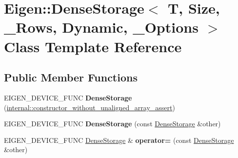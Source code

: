 \hypertarget{class_eigen_1_1_dense_storage_3_01_t_00_01_size_00_01___rows_00_01_dynamic_00_01___options_01_4}{}\section{Eigen\+:\+:Dense\+Storage$<$ T, Size, \+\_\+\+Rows, Dynamic, \+\_\+\+Options $>$ Class Template Reference}
\label{class_eigen_1_1_dense_storage_3_01_t_00_01_size_00_01___rows_00_01_dynamic_00_01___options_01_4}
\subsection*{Public Member Functions}
\begin{DoxyCompactItemize}
\item 
\mbox{\label{class_eigen_1_1_dense_storage_3_01_t_00_01_size_00_01___rows_00_01_dynamic_00_01___options_01_4_a33e2d80dc95f56436fa4203b92730b11}} 
E\+I\+G\+E\+N\+\_\+\+D\+E\+V\+I\+C\+E\+\_\+\+F\+U\+NC {\bfseries Dense\+Storage} (\hyperlink{struct_eigen_1_1internal_1_1constructor__without__unaligned__array__assert}{internal\+::constructor\+\_\+without\+\_\+unaligned\+\_\+array\+\_\+assert})
\item 
\mbox{\label{class_eigen_1_1_dense_storage_3_01_t_00_01_size_00_01___rows_00_01_dynamic_00_01___options_01_4_ab25c8b96ebc898d4a69bc99252d196f2}} 
E\+I\+G\+E\+N\+\_\+\+D\+E\+V\+I\+C\+E\+\_\+\+F\+U\+NC {\bfseries Dense\+Storage} (const \hyperlink{class_eigen_1_1_dense_storage}{Dense\+Storage} \&other)
\item 
\mbox{\label{class_eigen_1_1_dense_storage_3_01_t_00_01_size_00_01___rows_00_01_dynamic_00_01___options_01_4_aee2aff42b844dd472bd62fb5212df486}} 
E\+I\+G\+E\+N\+\_\+\+D\+E\+V\+I\+C\+E\+\_\+\+F\+U\+NC \hyperlink{class_eigen_1_1_dense_storage}{Dense\+Storage} \& {\bfseries operator=} (const \hyperlink{class_eigen_1_1_dense_storage}{Dense\+Storage} \&other)
\item 
\mbox{\label{class_eigen_1_1_dense_storage_3_01_t_00_01_size_00_01___rows_00_01_dynamic_00_01___options_01_4_a474eb4d3e1ee2002806f881e145fdaae}} 

\end{DoxyCompactItemize}
